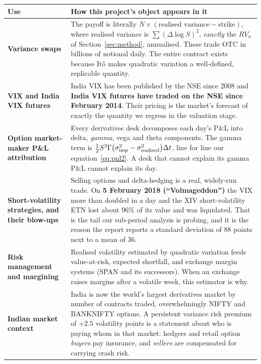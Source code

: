 \documentclass[11pt,a4paper]{article}
\begin{document}
\begin{table}[H]
\centering\small
\begin{tabular}{L{3.9cm}L{11.3cm}}
\toprule
\textbf{Use} & \textbf{How this project's object appears in it} \\
\midrule
\textbf{Variance swaps} & The payoff is literally
$N\times(\text{realised variance}-\text{strike})$, where realised variance is
$\sum(\Delta\log S)^2$, \emph{exactly} the $RV_n$ of Section~\ref{sec:method}, annualised.
These trade OTC in billions of notional daily. The entire contract exists because It\^o makes
quadratic variation a well-defined, replicable quantity. \\
\addlinespace
\textbf{VIX and India VIX futures} & India VIX has been published by the NSE since 2008 and
\textbf{India VIX futures have traded on the NSE since February 2014}. Their pricing is the
market's forecast of exactly the quantity we regress in the valuation stage. \\
\addlinespace
\textbf{Option market-maker P\&L attribution} & Every derivatives desk decomposes each day's
P\&L into delta, \emph{gamma}, vega and theta components. The gamma term is
$\tfrac{1}{2} S^2\Gamma\big(\sigma_{\mathrm{imp}}^2-\sigma_{\text{realised}}^2\big)\Delta t$, line for line our
equation~\eqref{eq:pnl2}. A desk that cannot explain its gamma P\&L cannot explain its day. \\
\addlinespace
\textbf{Short-volatility strategies, and their blow-ups} & Selling options and delta-hedging is
a real, widely-run trade. On \textbf{5 February 2018 (``Volmageddon'')} the VIX more than
doubled in a day and the XIV short-volatility ETN lost about $96\%$ of its value and was
liquidated. That is the tail our sub-period analysis is probing, and it is the reason the
report reports a standard deviation of $88$ points next to a mean of $36$. \\
\addlinespace
\textbf{Risk management and margining} & Realised volatility estimated by quadratic variation
feeds value-at-risk, expected shortfall, and exchange margin systems (SPAN and its successors).
When an exchange raises margins after a volatile week, this estimator is why. \\
\addlinespace
\textbf{Indian market context} & India is now the world's largest derivatives market by number
of contracts traded, overwhelmingly NIFTY and BANKNIFTY options. A persistent variance risk
premium of $+2.5$ volatility points is a statement about who is paying whom in that market:
hedgers and retail option \emph{buyers} pay insurance, and \emph{sellers} are compensated for
carrying crash risk. \\
\bottomrule
\end{tabular}
\end{table}
\end{document}
